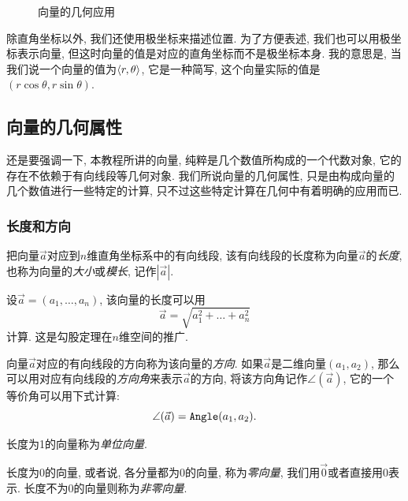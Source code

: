 \begin{figure}[htbp]
  \centering
  \caption{向量的几何应用}
  \label{fig:vector-geometry}
\end{figure}

除直角坐标以外, 我们还使用极坐标来描述位置.
为了方便表述, 我们也可以用极坐标表示向量,
但这时向量的值是对应的直角坐标而不是极坐标本身.
我的意思是, 当我们说一个向量的值为$\braket{r,\theta}$,
它是一种简写, 这个向量实际的值是$(r\cos\theta,r\sin\theta)$.

\subsection{向量的几何属性}

还是要强调一下, 本教程所讲的向量,
纯粹是几个数值所构成的一个代数对象,
它的存在不依赖于有向线段等几何对象.
我们所说向量的几何属性,
只是由构成向量的几个数值进行一些特定的计算,
只不过这些特定计算在几何中有着明确的应用而已.

\subsubsection{长度和方向}

把向量$\vec{a}$对应到$n$维直角坐标系中的有向线段,
该有向线段的长度称为向量$\vec{a}$的\emph{长度},
也称为向量的\emph{大小}或\emph{模长}, 记作$|\vec{a}|$.

设$\vec{a}=(a_1,\dots,a_n)$,
该向量的长度可以用
\[
  \vec{a} = \sqrt{a_1^2 + \dots + a_n^2}
\]
计算. 这是勾股定理在$n$维空间的推广.

向量$\vec{a}$对应的有向线段的方向称为该向量的\emph{方向}.
如果$\vec{a}$是二维向量$(a_1,a_2)$,
那么可以用对应有向线段的\emph{方向角}来表示$\vec{a}$的方向,
将该方向角记作$\angle(\vec{a})$, 它的一个等价角可以用下式计算:
\[
\angle(\vec{a}) = \texttt{Angle}(a_1,a_2).
\]

长度为1的向量称为\emph{单位向量}.

长度为0的向量, 或者说, 各分量都为0的向量, 称为\emph{零向量},
我们用$\vec0$或者直接用0表示.
长度不为0的向量则称为\emph{非零向量}.

